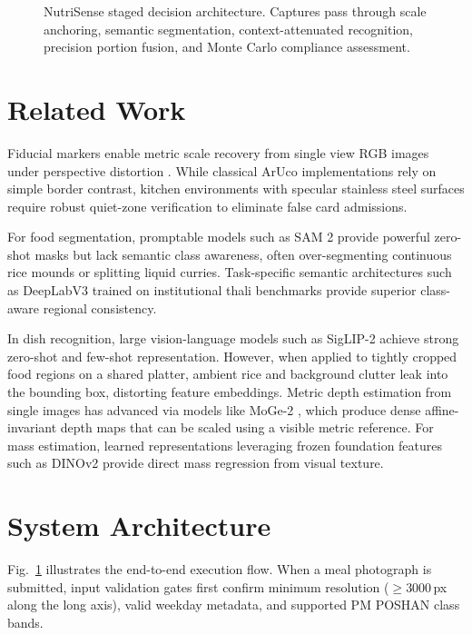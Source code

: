 \documentclass[conference]{IEEEtran}
\begin{document}
\begin{figure}[!t]
{%
}
\caption{NutriSense staged decision architecture. Captures pass through scale anchoring, semantic segmentation, context-attenuated recognition, precision portion fusion, and Monte Carlo compliance assessment.}
\label{fig:pipeline_flow}
\end{figure}

\section{Related Work}
Fiducial markers enable metric scale recovery from single view RGB images under perspective distortion \cite{garrido2014aruco}. While classical ArUco implementations rely on simple border contrast, kitchen environments with specular stainless steel surfaces require robust quiet-zone verification to eliminate false card admissions.

For food segmentation, promptable models such as SAM 2 \cite{ravi2025sam2,meta2024sam2repo} provide powerful zero-shot masks but lack semantic class awareness, often over-segmenting continuous rice mounds or splitting liquid curries. Task-specific semantic architectures such as DeepLabV3 trained on institutional thali benchmarks \cite{arun2025thali} provide superior class-aware regional consistency.

In dish recognition, large vision-language models such as SigLIP-2 \cite{tschannen2025siglip2} achieve strong zero-shot and few-shot representation. However, when applied to tightly cropped food regions on a shared platter, ambient rice and background clutter leak into the bounding box, distorting feature embeddings. Metric depth estimation from single images has advanced via models like MoGe-2 \cite{wang2025moge2}, which produce dense affine-invariant depth maps that can be scaled using a visible metric reference. For mass estimation, learned representations leveraging frozen foundation features such as DINOv2 \cite{oquab2024dinov2} provide direct mass regression from visual texture.

\section{System Architecture}
Fig.~\ref{fig:pipeline_flow} illustrates the end-to-end execution flow. When a meal photograph is submitted, input validation gates first confirm minimum resolution ($\ge 3000$\,px along the long axis), valid weekday metadata, and supported PM POSHAN class bands.
\end{document}
